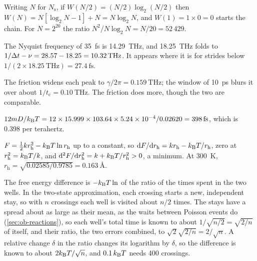 Writing $N$ for $N_{\mathrm s}$, if $W(N/2) =
(N/2)\log_2(N/2)$ then $W(N) = N[\log_2N - 1] + N = N\log_2N$, and $W(1)
= 1\times0 = 0$ starts the chain. For $N = 2^{20}$ the ratio
$N^2/N\log_2N = N/20 = 52\,429$.

The Nyquist frequency of \SI{35}{\femto\second} is
\SI{14.29}{\tera\hertz}, and \SI{18.25}{\tera\hertz} folds to $1/\Dt - \nu =
28.57 - 18.25 = \SI{10.32}{\tera\hertz}$. It appears where it is for strides
below $1/(2\times\SI{18.25}{\tera\hertz}) = \SI{27.4}{\femto\second}$.

The friction widens each peak to $\gamma/2\pi =
\SI{0.159}{\tera\hertz}$; the window of \SI{10}{\pico\second} blurs it over
about $1/t_{\mathrm c} = \SI{0.10}{\tera\hertz}$. The friction does more,
though the two are comparable.

$12mD/\kB T = 12\times15.999\times
\num{103.64}\times\num{5.24e-4}/0.02620 = \SI{398}{\femto\second}$, which
is 0.398 per terahertz.

$F = \frac12kr_{\mathrm h}^2 - k_{\mathrm{B}} T\ln r_{\mathrm h}$ up to a constant, so
$\mathrm{d} F/\mathrm{d} r_{\mathrm h} = kr_{\mathrm h} - k_{\mathrm{B}} T/r_{\mathrm h}$, zero at $r_{\mathrm h}^2 = k_{\mathrm{B}} T/k$, and $\mathrm{d}^2F/\mathrm{d} r_{\mathrm h}^2 =
k + k_{\mathrm{B}} T/r_{\mathrm h}^2 > 0$, a minimum. At \SI{300}{\kelvin}, $r_{\mathrm h} = \sqrt{0.02585/
0.9785} = \SI{0.163}{\angstrom}$.

The free energy difference is $-k_{\mathrm{B}} T\ln$ of
the ratio of the times spent in the two wells. In the two-state approximation, each crossing starts a
new, independent stay, so with $n$ crossings each well is visited about
$n/2$ times. The stays have a spread about as large as their mean, as
the waits between Poisson events do (\cref{sec:ob-reactions}), so each
well's total time is known to about $1/\sqrt{n/2} = \sqrt{2/n}$ of
itself, and their ratio, the two errors combined, to $\sqrt2\sqrt{2/n} =
2/\sqrt n$. A relative change $\delta$ in the ratio changes its logarithm
by $\delta$, so the difference is known to about $2k_{\mathrm{B}} T/\sqrt n$, and
$0.1\,k_{\mathrm{B}} T$ needs 400 crossings.
